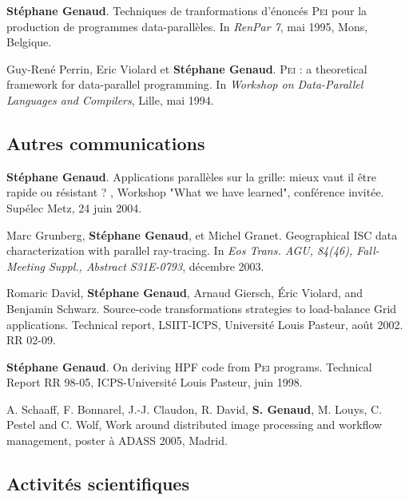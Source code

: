 \documentclass[11pt]{article}
\begin{document}
\begin{thebibliography}{99}
\textbf{Stéphane Genaud}.
\newblock Techniques de tranformations d'énoncés \textsc{Pei} pour la
  production de programmes data-parallèles.
\newblock In {\em RenPar 7}, mai 1995, Mons, Belgique.

Guy-René Perrin, Eric Violard et \textbf{Stéphane Genaud}.
\newblock \textsc{Pei} : a theoretical framework for data-parallel programming.
\newblock In {\em Workshop on Data-Parallel Languages and Compilers}, Lille, mai 1994.
\vspace{3mm}


\subsection*{Autres communications}


\textbf{Stéphane Genaud}.
\newblock Applications parallèles sur la grille: mieux vaut il être rapide ou résistant ? 
, Workshop "What we have learned", conférence invitée.
\newblock Supélec Metz, 24 juin 2004. 


Marc Grunberg, \textbf{Stéphane Genaud}, et Michel Granet.
\newblock Geographical {ISC} data characterization with parallel ray-tracing.
\newblock In {\em Eos Trans. AGU, 84(46), Fall-Meeting Suppl., Abstract
  S31E-0793}, décembre 2003.

Romaric David, \textbf{Stéphane Genaud}, Arnaud Giersch, \'{E}ric Violard, and
  Benjamin Schwarz.
\newblock Source-code transformations strategies to load-balance {G}rid
  applications.
\newblock Technical report, LSIIT-ICPS, Université Louis Pasteur, août
  2002.
\newblock RR 02-09.


\textbf{Stéphane Genaud}.
\newblock On deriving {HPF} code from \textsc{Pei} programs.
\newblock Technical Report RR 98-05, ICPS-Université Louis Pasteur, juin
  1998.

A. Schaaff, F. Bonnarel, J.-J. Claudon, R. David, \textbf{S. Genaud}, M. Louys, C. Pestel and C. Wolf, 
\newblock Work around distributed image processing and workflow management, 
\newblock poster à ADASS 2005, Madrid.



\end{thebibliography}



\subsection{Activités scientifiques}
\end{document}
